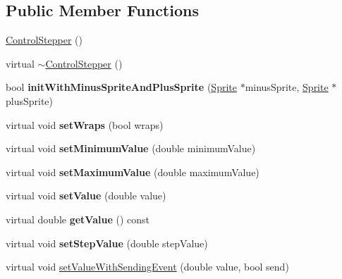 \subsection*{Public Member Functions}
\begin{DoxyCompactItemize}
\item 
\hyperlink{classControlStepper_af1c262fd75987df18882ac63fdf0d1bc}{Control\+Stepper} ()
\item 
virtual \hyperlink{classControlStepper_af613e70c05c8dd2ba046aa1cafea8504}{$\sim$\+Control\+Stepper} ()
\item 
\mbox{\label{classControlStepper_a405ed5a59df38ba8553ddfac2528e73b}} 
bool {\bfseries init\+With\+Minus\+Sprite\+And\+Plus\+Sprite} (\hyperlink{classSprite}{Sprite} $\ast$minus\+Sprite, \hyperlink{classSprite}{Sprite} $\ast$plus\+Sprite)
\item 
\mbox{\label{classControlStepper_abb57bf1e44af87e0d7bfbb6a0360bb7b}} 
virtual void {\bfseries set\+Wraps} (bool wraps)
\item 
\mbox{\label{classControlStepper_a672275bbdf24d5b0e7f5f64db6d5ec97}} 
virtual void {\bfseries set\+Minimum\+Value} (double minimum\+Value)
\item 
\mbox{\label{classControlStepper_a4a75ccac3d60ca5adcb3a6f3792256b1}} 
virtual void {\bfseries set\+Maximum\+Value} (double maximum\+Value)
\item 
\mbox{\label{classControlStepper_ac0f3211518c0f86b6820bebbafe007aa}} 
virtual void {\bfseries set\+Value} (double value)
\item 
\mbox{\label{classControlStepper_ae2fa648bdfd0ce2e2727288573d6fede}} 
virtual double {\bfseries get\+Value} () const
\item 
\mbox{\label{classControlStepper_ad2d81081134d7f4c1389875cbce30ba2}} 
virtual void {\bfseries set\+Step\+Value} (double step\+Value)
\item 
virtual void \hyperlink{classControlStepper_ad71e9ce56be2a8e40d2c57e2866fbed2}{set\+Value\+With\+Sending\+Event} (double value, bool send)
\item 
\mbox{\label{classControlStepper_a5db4eb37303d678db1636f0be6169bc1}} 

\end{DoxyCompactItemize}
